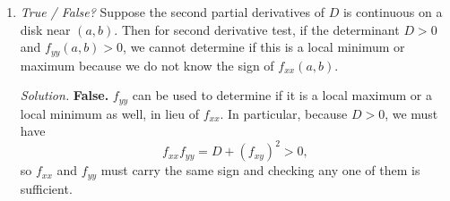 \documentclass{article}
\begin{document}
\begin{enumerate}
\item {\em True / False?} Suppose the second partial derivatives of $D$ is continuous on a disk near $(a, b)$. Then for second derivative test, if the determinant $D > 0$ and $f_{yy}(a, b) > 0$, we cannot determine if this is a local minimum or maximum because we do not know the sign of $f_{xx}(a, b)$.

{\em Solution.} {\bf False.} $f_{yy}$ can be used to determine if it is a local maximum or a local minimum as well, in lieu of $f_{xx}$. In particular, because $D > 0$, we must have
\[
f_{xx} f_{yy} = D + (f_{xy})^2 > 0,
\]
so $f_{xx}$ and $f_{yy}$ must carry the same sign and checking any one of them is sufficient.
\end{enumerate}
\end{document}
